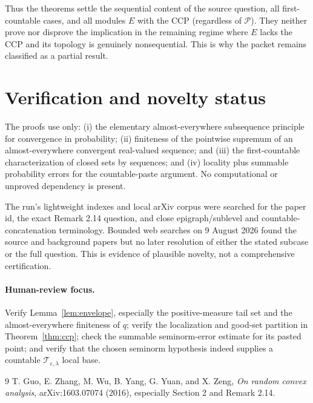 \documentclass[11pt]{article}
\newcommand{\Tep}{\mathcal T_{\varepsilon,\lambda}}
\begin{document}
Thus the theorems settle the sequential content of the source question, all
first-countable cases, and all modules $E$ with the CCP (regardless of
$\mathcal P$).  They neither prove nor disprove the implication in the
remaining regime where $E$ lacks the CCP and its topology is genuinely
nonsequential.  This is why the packet remains classified as a partial result.

\section{Verification and novelty status}

The proofs use only: (i) the elementary almost-everywhere subsequence
principle for convergence in probability; (ii) finiteness of the pointwise
supremum of an almost-everywhere convergent real-valued sequence; and (iii)
the first-countable characterization of closed sets by sequences; and (iv)
locality plus summable probability errors for the countable-paste argument.
No computational or unproved dependency is present.

The run's lightweight indexes and local arXiv corpus were searched for the
paper id, the exact Remark 2.14 question, and close epigraph/sublevel and
countable-concatenation terminology.  Bounded web searches on 9 August 2026
found the source and background papers but no later resolution of either the
stated subcase or the full question.  This is evidence of plausible novelty,
not a comprehensive certification.

\paragraph{Human-review focus.}
Verify Lemma~\ref{lem:envelope}, especially the positive-measure tail set and
the almost-everywhere finiteness of $q$; verify the localization and good-set
partition in Theorem~\ref{thm:ccp}; check the summable seminorm-error estimate
for its pasted point; and verify that the chosen seminorm hypothesis indeed
supplies a countable $\Tep$ local base.

\begin{thebibliography}{9}
T. Guo, E. Zhang, M. Wu, B. Yang, G. Yuan, and X. Zeng,
\emph{On random convex analysis}, arXiv:1603.07074 (2016), especially
Section 2 and Remark 2.14.
\end{thebibliography}
\end{document}

